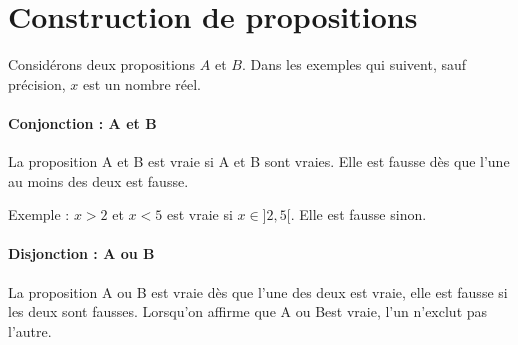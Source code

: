 \section{Construction de propositions}

Considérons deux propositions $A$ et $B$. Dans les exemples qui suivent, sauf précision, $x$ est un nombre réel.

\paragraph{Conjonction : \og A et B\fg} 

La proposition \og A et B \fg{} est vraie si A et B sont vraies. Elle est fausse dès que l'une au moins des deux est fausse.

Exemple : \og$x>2$ et $x<5$\fg{} est vraie si $x\in]2,5[$. Elle est fausse sinon.

\paragraph{Disjonction : \og A ou B\fg} 

La proposition  \og A ou B\fg{} est vraie dès que l'une des deux est vraie, elle est fausse si les deux sont fausses. Lorsqu'on affirme que \og A ou B\fg est vraie, l'un n'exclut pas l'autre.

